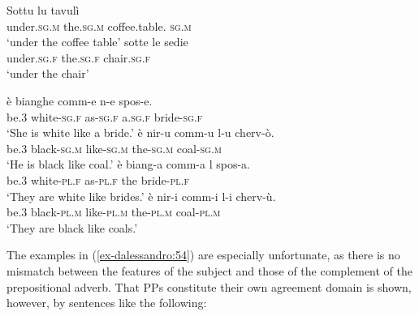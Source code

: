 \documentclass[output=paper
,modfonts
,nonflat]{langsci/langscibook}
\begin{document}
\begin{exe}
	\ex \label{ex-dalessandro:53}\citet[309]{Ledgeway2012} \xlist
	\ex 
	\gll Sottu      lu     tavulì \\
	under.\textsc{sg}.\textsc{m}   the.\textsc{sg}.\textsc{m}  coffee.table. \textsc{sg}.\textsc{m}\\
	\glt `under the coffee table' 
	\ex
	\gll  sotte     le     sedie\\
	under.\textsc{sg}.\textsc{f}  the.\textsc{sg}.\textsc{f}  chair.\textsc{sg}.\textsc{f}\\
	\glt `under the chair' 
	\endxlist

\ex\label{ex-dalessandro:54} \citet[54]{Lambertelli2003} \xlista
	\ex 
	\gll   è   bianghe   comm-e   n-e   spos-e.\\
	be.\textsc{3}  white-\textsc{sg.f} as-\textsc{sg.f}    a.\textsc{sg.f}  bride-\textsc{sg.f}\\
	\glt `She is white like a bride.' 
	\ex
	\gll  è   nir-u     comm-u   l-u     cherv-ò.\\
	be.3  black-\textsc{sg.m} like-\textsc{sg.m} the-\textsc{sg.m} coal-\textsc{sg.m}\\
	\glt `He is black like coal.' 
	\ex
	\gll  è  biang-a    comm-a  l  spos-a.\\
	be.3  white-\textsc{pl.f} as-\textsc{pl.f}    the  bride-\textsc{pl.f}\\
	\glt `They are white like brides.' 
	\ex
	\gll  è   nir-i     comm-i  l-i     cherv-ù.\\
	be.3   black-\textsc{pl.m} like-\textsc{pl.m} the-\textsc{pl.m} coal-\textsc{pl.m}\\
	\glt `They are black like coals.'
	\endxlista
\end{exe}
The examples in (\ref{ex-dalessandro:54}) are especially unfortunate, as there is no mismatch between the features of the subject and those of the complement of the prepositional adverb. That PPs constitute their own agreement domain is shown, however, by sentences like the following:
\end{document}
